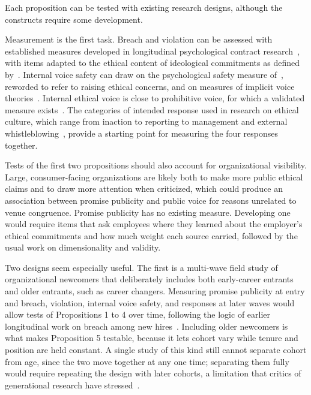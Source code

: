 Each proposition can be tested with existing research designs, although the constructs require some development.

Measurement is the first task. Breach and violation can be assessed with established measures developed in longitudinal psychological contract research~\citep{robinson2000development}, with items adapted to the ethical content of ideological commitments as defined by~\citet{thompson2003violations}. Internal voice safety can draw on the psychological safety measure of~\citet{edmondson1999psychological}, reworded to refer to raising ethical concerns, and on measures of implicit voice theories~\citep{detert2011implicit}. Internal ethical voice is close to prohibitive voice, for which a validated measure exists~\citep{liang2012psychological}. The categories of intended response used in research on ethical culture, which range from inaction to reporting to management and external whistleblowing~\citep{kaptein2011inaction}, provide a starting point for measuring the four responses together.

Tests of the first two propositions should also account for organizational visibility. Large, consumer-facing organizations are likely both to make more public ethical claims and to draw more attention when criticized, which could produce an association between promise publicity and public voice for reasons unrelated to venue congruence. Promise publicity has no existing measure. Developing one would require items that ask employees where they learned about the employer's ethical commitments and how much weight each source carried, followed by the usual work on dimensionality and validity.

Two designs seem especially useful. The first is a multi-wave field study of organizational newcomers that deliberately includes both early-career entrants and older entrants, such as career changers. Measuring promise publicity at entry and breach, violation, internal voice safety, and responses at later waves would allow tests of Propositions 1 to 4 over time, following the logic of earlier longitudinal work on breach among new hires~\citep{robinson2000development}. Including older newcomers is what makes Proposition 5 testable, because it lets cohort vary while tenure and position are held constant. A single study of this kind still cannot separate cohort from age, since the two move together at any one time; separating them fully would require repeating the design with later cohorts, a limitation that critics of generational research have stressed~\citep{parry2011generational,rudolph2021generations}.

